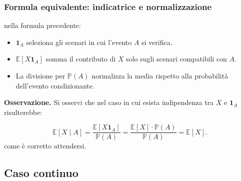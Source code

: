 \documentclass[handout]{beamer}%
\newenvironment{stepitemize}{\begin{itemize}[<+->]}{\end{itemize} }
\providecommand{\E}{\mathbb{E}}
\providecommand{\Prob}{\mathbb{P}}
\providecommand{\1}{\mathbf{1}}
\providecommand{\QTR}[2]{\csname #1\endcsname{#2}}
\begin{document}
\begin{frame}%
%

\frametitle{Formula equivalente: indicatrice e normalizzazione}%
%

%


nella formula precedente:

\begin{stepitemize}
\item $\1_{A}$ seleziona gli scenari in cui l'evento $A$ si verifica.

\item $\E[X\1_{A}]$ somma il contributo di $X$ solo sugli scenari compatibili
con $A$.

\item La divisione per $\Prob(A)$ normalizza la media rispetto alla
probabilit\`{a} dell'evento condizionante.
\end{stepitemize}

\medskip

\textbf{Osservazione.} Si osservi che nel caso in cui esista indipendenza tra
$X$ e $\1_{A}$ risulterebbe:%

\[
\E[X\mid A] = \frac{\E[X\1_{A}]}{\Prob(A)} = \frac{\E[X] \cdot\Prob(A)}%
{\Prob(A)} =\E[X].
\]
come \`{e} corretto attendersi.%

\transboxout
\end{frame}%


\subsection{Caso continuo}%
\end{document}
